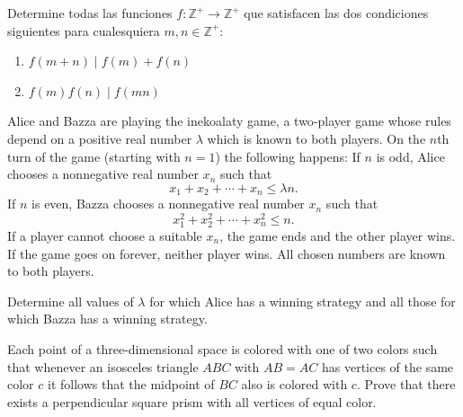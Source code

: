 \documentclass[11pt]{scrartcl}
\newcommand{\thmdifficulty}{0}
\newcommand{\problemdiff}[1]{\renewcommand{\thmdifficulty}{#1}}
\begin{document}
\problemdiff{5}
\begin{problem} [OMM 2023/6]
    Determine todas las funciones $f: \mathbb{Z}^+ \rightarrow \mathbb {Z}^+$ que satisfacen las dos condiciones siguientes para cualesquiera $m,n \in \mathbb{Z}^+$:
    \begin{enumerate}
        \item $f(m+n) \mid f(m)+f(n)$
        \item $f(m)f(n) \mid f(mn)$
    \end{enumerate}
\end{problem}

\problemdiff{5}
\begin{problem}
    [IMO 2025/5]
    Alice and Bazza are playing the inekoalaty game, a two‑player game whose rules depend on a positive real number $\lambda$ which is known to both players. On the $n$th turn of the game (starting with $n=1$) the following happens:
If $n$ is odd, Alice chooses a nonnegative real number $x_n$ such that
\[
    x_1 + x_2 + \cdots + x_n \le \lambda n.
  \]
If $n$ is even, Bazza chooses a nonnegative real number $x_n$ such that
\[
    x_1^2 + x_2^2 + \cdots + x_n^2 \le n.
  \]
If a player cannot choose a suitable $x_n$, the game ends and the other player wins. If the game goes on forever, neither player wins. All chosen numbers are known to both players.

Determine all values of $\lambda$ for which Alice has a winning strategy and all those for which Bazza has a winning strategy.
\end{problem}


\problemdiff{5}

\begin{problem}

    Each point of a three-dimensional space is colored
    with one of two colors such that
    whenever an isosceles triangle $ABC$ with $AB = AC$
    has vertices of the same color $c$ it follows that
    the midpoint of $BC$ also is colored with $c$.
    Prove that there exists a perpendicular square prism
    with all vertices of equal color.

    
\end{problem}
\end{document}
